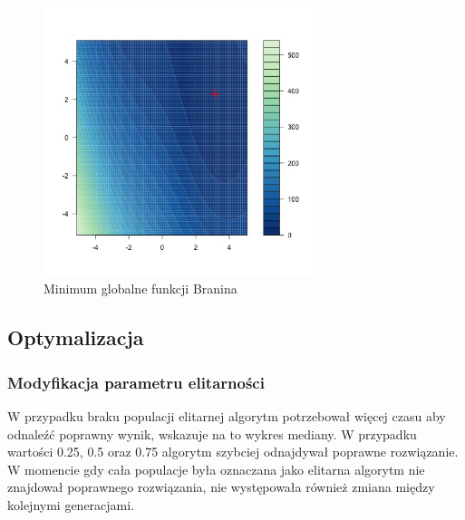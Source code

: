 \documentclass{article}
\begin{document}
 
 \begin{figure}[!htbp]
    \centering
    \includegraphics[width=0.7\textwidth]{inc/wykresyfunkcji/branin-global-minimum}
     \caption{Minimum globalne funkcji Branina}
    \end{figure}             
    
       
\subsection{Optymalizacja}            

\subsubsection{Modyfikacja parametru elitarności}    

W przypadku braku populacji elitarnej algorytm potrzebował więcej czasu aby odnaleźć poprawny wynik, wskazuje na to wykres mediany. W przypadku wartości 0.25, 0.5 oraz 0.75 algorytm szybciej odnajdywał poprawne rozwiązanie. W momencie gdy cała populacje była oznaczana jako elitarna algorytm nie znajdował poprawnego rozwiązania, nie występowała również zmiana między kolejnymi generacjami. 
\end{document}
